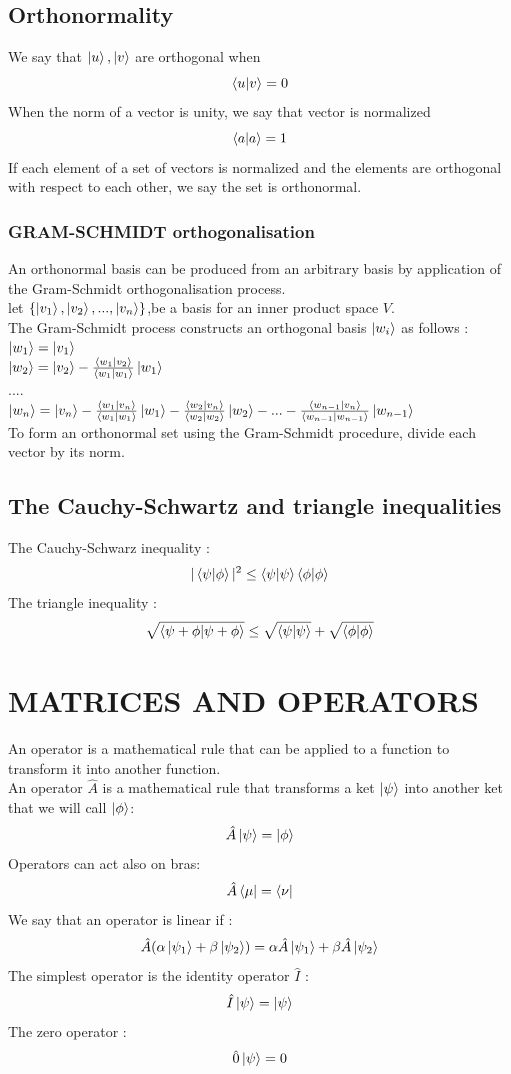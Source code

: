 \documentclass[12pt,oneside]{book}
\begin{document}
\section{Orthonormality}
We say that $\ket{u},\ket{v}$ are orthogonal when
\[\braket{u|v} = 0\]
When the norm of a vector is unity, we say that vector is normalized
\[\braket{a|a} = 1\]
If each element of a set of vectors is normalized and the elements are orthogonal with respect to each other, we say the set is orthonormal.
\subsection{GRAM-SCHMIDT orthogonalisation}
An orthonormal basis can be produced from an arbitrary basis by application of the Gram-Schmidt orthogonalisation process.\\
let $\{ \ket{v_1},\ket{v_2},...,\ket{v_n} \}$,be a basis for an inner product space $V$.\\
The Gram-Schmidt process constructs an orthogonal basis $\ket{w_i}$ as follows :\\
$\ket{w_1} = \ket{v_1}$\\
$\ket{w_2} = \ket{v_2} - \frac{\braket{w_1|v_2}}{\braket{w_1|w_1}}\ket{w_1}$\\
....\\
$\ket{w_n} = \ket{v_n} - \frac{\braket{w_1|v_n}}{\braket{w_1|w_1}}\ket{w_1} - \frac{\braket{w_2|v_n}}{\braket{w_2|w_2}}\ket{w_2} - ... - \frac{\braket{w_{n-1}|v_n}}{\braket{w_{n-1}|w_{n-1}}}\ket{w_{n-1}}$\\
To form an orthonormal set using the Gram-Schmidt procedure, divide each vector by its norm.
\section{The Cauchy-Schwartz and triangle inequalities}
The Cauchy-Schwarz inequality :
\[ |\braket{\psi|\phi}|^2 \leq \braket{\psi|\psi}\braket{\phi|\phi} \]
The triangle inequality :
\[ \sqrt{\braket{\psi + \phi|\psi+\phi}} \leq \sqrt{\braket{\psi|\psi}} + \sqrt{\braket{\phi|\phi}} \]
\chapter{MATRICES AND OPERATORS}
An operator is a mathematical rule that can be applied to a function to transform it into another function.\\
An operator $\hat{A}$ is a mathematical rule that transforms a ket $\ket{\psi}$ into another ket that we will call $\ket{\phi}$:
\[\hat{A}\ket{\psi} = \ket{\phi}\]
Operators can act also on bras:
\[ \hat{A}\bra{\mu} = \bra{\nu} \]
We say that an operator is linear if :
\[\hat{A} (\alpha\ket{\psi_1}+\beta\ket{\psi_2}) = \alpha\hat{A}\ket{\psi_1} + \beta\hat{A}\ket{\psi_2}\]
The simplest operator is the identity operator $\hat{I}$ :
\[\hat{I} \ket{\psi} = \ket{\psi}\]
The zero operator :
\[\hat{0}\ket{\psi} = 0\]
\end{document}
